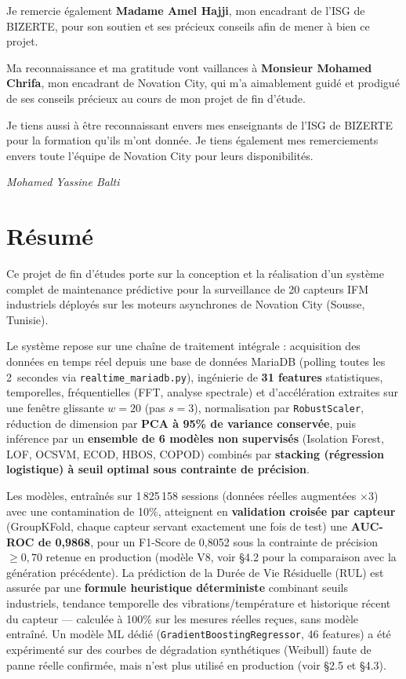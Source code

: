 \documentclass[12pt,a4paper]{report}
\begin{document}
Je remercie également \textbf{Madame Amel Hajji}, mon encadrant de l'ISG de BIZERTE,
pour son soutien et ses précieux conseils afin de mener à bien ce projet.

Ma reconnaissance et ma gratitude vont vaillances à \textbf{Monsieur Mohamed Chrifa},
mon encadrant de Novation City, qui m'a aimablement guidé et prodigué de ses conseils
précieux au cours de mon projet de fin d'étude.

Je tiens aussi à être reconnaissant envers mes enseignants de l'ISG de BIZERTE pour
la formation qu'ils m'ont donnée. Je tiens également mes remerciements envers toute
l'équipe de Novation City pour leurs disponibilités.

\hfill \textit{Mohamed Yassine Balti}

\chapter*{Résumé}

Ce projet de fin d'études porte sur la conception et la réalisation d'un système
complet de maintenance prédictive pour la surveillance de 20 capteurs IFM industriels
déployés sur les moteurs asynchrones de Novation City (Sousse, Tunisie).

Le système repose sur une chaîne de traitement intégrale : acquisition des données en
temps réel depuis une base de données MariaDB (polling toutes les 2~secondes via
\texttt{realtime\_mariadb.py}), ingénierie de \textbf{31 features} statistiques, temporelles,
fréquentielles (FFT, analyse spectrale) et d'accélération extraites sur une fenêtre
glissante $w=20$ (pas $s=3$), normalisation par \texttt{RobustScaler}, réduction de dimension par
\textbf{PCA à 95\% de variance conservée}, puis inférence par un \textbf{ensemble de
6 modèles non supervisés} (Isolation Forest, LOF, OCSVM, ECOD, HBOS, COPOD)
combinés par \textbf{stacking (régression logistique) à seuil optimal sous contrainte
de précision}.

Les modèles, entraînés sur 1\,825\,158 sessions (données réelles augmentées $\times 3$) avec
une contamination de 10\%, atteignent en \textbf{validation croisée par capteur}
(GroupKFold, chaque capteur servant exactement une fois de test) une
\textbf{AUC-ROC de 0,9868}, pour un F1-Score de 0,8052 sous la contrainte de précision
$\geq 0{,}70$ retenue en production (modèle V8, voir §4.2 pour la comparaison avec la
génération précédente). La prédiction de la Durée de Vie Résiduelle (RUL) est assurée par
une \textbf{formule heuristique déterministe} combinant seuils industriels, tendance
temporelle des vibrations/température et historique récent du capteur — calculée à 100\%
sur les mesures réelles reçues, sans modèle entraîné. Un modèle ML dédié
(\texttt{GradientBoostingRegressor}, 46 features) a été expérimenté sur des courbes de
dégradation synthétiques (Weibull) faute de panne réelle confirmée, mais n'est plus utilisé
en production (voir §2.5 et §4.3).
\end{document}
